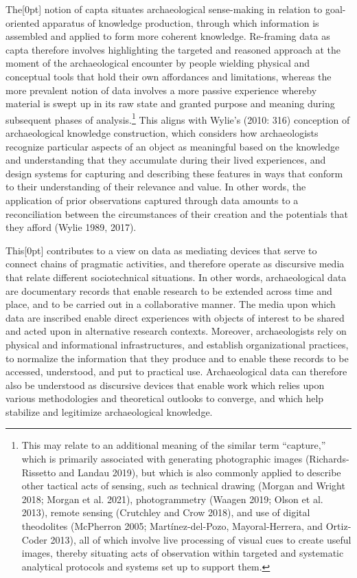 \documentclass[
]{article}
\newcommand{\paragraphnumber}[1]{\marginnote{\color{lightgray}\tiny{#1}}[0pt]}
\begin{document}
The\paragraphnumber{[9]} notion of capta situates archaeological
sense-making in relation to goal-oriented apparatus of knowledge
production, through which information is assembled and applied to form
more coherent knowledge. Re-framing data as capta therefore involves
highlighting the targeted and reasoned approach at the moment of the
archaeological encounter by people wielding physical and conceptual
tools that hold their own affordances and limitations, whereas the more
prevalent notion of data involves a more passive experience whereby
material is swept up in its raw state and granted purpose and meaning
during subsequent phases of analysis.\footnote{This may relate to an
  additional meaning of the similar term ``capture,'' which is primarily
  associated with generating photographic images (Richards-Rissetto and
  Landau 2019), but which is also commonly applied to describe other
  tactical acts of sensing, such as technical drawing (Morgan and Wright
  2018; Morgan et al. 2021), photogrammetry (Waagen 2019; Olson et al.
  2013), remote sensing (Crutchley and Crow 2018), and use of digital
  theodolites (McPherron 2005; Martínez-del-Pozo, Mayoral-Herrera, and
  Ortiz-Coder 2013), all of which involve live processing of visual cues
  to create useful images, thereby situating acts of observation within
  targeted and systematic analytical protocols and systems set up to
  support them.} This aligns with Wylie's (2010: 316) conception of
archaeological knowledge construction, which considers how
archaeologists recognize particular aspects of an object as meaningful
based on the knowledge and understanding that they accumulate during
their lived experiences, and design systems for capturing and describing
these features in ways that conform to their understanding of their
relevance and value. In other words, the application of prior
observations captured through data amounts to a reconciliation between
the circumstances of their creation and the potentials that they afford
(Wylie 1989, 2017).

This\paragraphnumber{[10]} contributes to a view on data as mediating
devices that serve to connect chains of pragmatic activities, and
therefore operate as discursive media that relate different
sociotechnical situations. In other words, archaeological data are
documentary records that enable research to be extended across time and
place, and to be carried out in a collaborative manner. The media upon
which data are inscribed enable direct experiences with objects of
interest to be shared and acted upon in alternative research contexts.
Moreover, archaeologists rely on physical and informational
infrastructures, and establish organizational practices, to normalize
the information that they produce and to enable these records to be
accessed, understood, and put to practical use. Archaeological data can
therefore also be understood as discursive devices that enable work
which relies upon various methodologies and theoretical outlooks to
converge, and which help stabilize and legitimize archaeological
knowledge.
\end{document}
